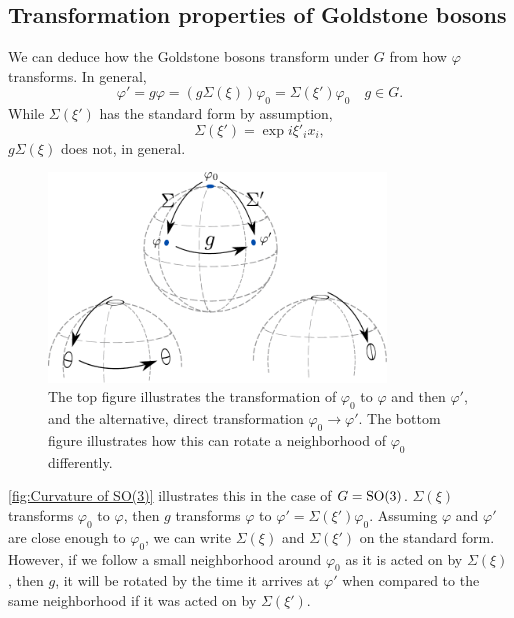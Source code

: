 \subsection{Transformation properties of Goldstone bosons}

We can deduce how the Goldstone bosons transform under $G$ from how $\varphi$ transforms.
In general, 
%
\begin{equation}
    \varphi' = g \varphi = (g \Sigma(\xi)) \varphi_0 = \Sigma(\xi') \varphi_0 \quad g \in G.
\end{equation}
%
While $\Sigma(\xi')$ has the standard form by assumption,
%
\begin{equation}
    \Sigma(\xi') = \exp{i \xi'_i x_i},
\end{equation}
%
$g\Sigma(\xi)$ does not, in general.

\begin{figure}[h]
    \centering
    \includegraphics[width=0.8\textwidth]{figurer/curvature.pdf}
    \caption{The top figure illustrates the transformation of $\varphi_0$ to $\varphi$ and then $\varphi'$, and the alternative, direct transformation $\varphi_0 \rightarrow \varphi'$. The bottom figure illustrates how this can rotate a neighborhood of $\varphi_0$ differently.}
    \label{fig:Curvature of SO(3)}
\end{figure}


\autoref{fig:Curvature of SO(3)} illustrates this in the case of $G = \text{SO}(3)$.
$\Sigma(\xi)$ transforms $\varphi_0$ to $\varphi$, then $g$ transforms $\varphi$ to $\varphi' = \Sigma(\xi') \varphi_0$.
Assuming $\varphi$ and $\varphi'$ are close enough to $\varphi_0$, we can write $\Sigma(\xi)$ and $\Sigma(\xi')$ on the standard form.
However, if we follow a small neighborhood around $\varphi_0$ as it is acted on by $\Sigma(\xi)$, then $g$, it will be rotated by the time it arrives at $\varphi'$ when compared to the same neighborhood if it was acted on by $\Sigma(\xi')$.

